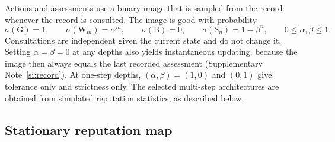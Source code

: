 \documentclass[fleqn,10pt]{wlscirep}
\newcommand{\st}[1]{\mathrm{#1}}           %
\theoremstyle{plain}
\begin{document}
Actions and assessments use a binary image that is sampled from the record whenever the record is consulted. The image is good with probability
\begin{equation}
\sigma(\st G)=1,\qquad \sigma(\st W_m)=\alpha^m,\qquad \sigma(\st B)=0,\qquad \sigma(\st S_n)=1-\beta^n,\qquad 0\leq\alpha,\beta\leq1.
\label{eq:m-readout}
\end{equation}
Consultations are independent given the current state and do not change it. Setting $\alpha=\beta=0$ at any depths also yields instantaneous updating, because the image then always equals the last recorded assessment (Supplementary Note~\ref{si:record}). At one-step depths, $(\alpha,\beta)=(1,0)$ and $(0,1)$ give tolerance only and strictness only. The selected multi-step architectures are obtained from simulated reputation statistics, as described below.

\subsection*{Stationary reputation map}
\end{document}
